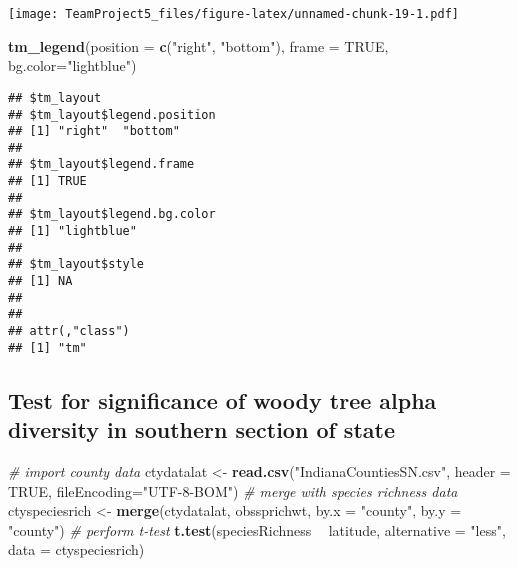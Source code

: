 \documentclass[
]{article}
\newenvironment{Shaded}{\begin{snugshade}}{\end{snugshade}}
\newcommand{\CommentTok}[1]{\textcolor[rgb]{0.56,0.35,0.01}{\textit{#1}}}
\newcommand{\DataTypeTok}[1]{\textcolor[rgb]{0.13,0.29,0.53}{#1}}
\newcommand{\KeywordTok}[1]{\textcolor[rgb]{0.13,0.29,0.53}{\textbf{#1}}}
\newcommand{\NormalTok}[1]{#1}
\newcommand{\OperatorTok}[1]{\textcolor[rgb]{0.81,0.36,0.00}{\textbf{#1}}}
\newcommand{\OtherTok}[1]{\textcolor[rgb]{0.56,0.35,0.01}{#1}}
\newcommand{\StringTok}[1]{\textcolor[rgb]{0.31,0.60,0.02}{#1}}
\begin{document}
\texttt{[image: TeamProject5\_files/figure-latex/unnamed-chunk-19-1.pdf]}

\begin{Shaded}
\begin{Highlighting}[]
\KeywordTok{tm_legend}\NormalTok{(}\DataTypeTok{position =} \KeywordTok{c}\NormalTok{(}\StringTok{"right"}\NormalTok{, }\StringTok{"bottom"}\NormalTok{), }
    \DataTypeTok{frame =} \OtherTok{TRUE}\NormalTok{,}
    \DataTypeTok{bg.color=}\StringTok{"lightblue"}\NormalTok{)}
\end{Highlighting}
\end{Shaded}

\begin{verbatim}
## $tm_layout
## $tm_layout$legend.position
## [1] "right"  "bottom"
## 
## $tm_layout$legend.frame
## [1] TRUE
## 
## $tm_layout$legend.bg.color
## [1] "lightblue"
## 
## $tm_layout$style
## [1] NA
## 
## 
## attr(,"class")
## [1] "tm"
\end{verbatim}

\hypertarget{test-for-significance-of-woody-tree-alpha-diversity-in-southern-section-of-state}{%
\subsection{Test for significance of woody tree alpha diversity in
southern section of
state}\label{test-for-significance-of-woody-tree-alpha-diversity-in-southern-section-of-state}}

\begin{Shaded}
\begin{Highlighting}[]
\CommentTok{# import county data}
\NormalTok{ctydatalat <-}\StringTok{ }\KeywordTok{read.csv}\NormalTok{(}\StringTok{"IndianaCountiesSN.csv"}\NormalTok{, }\DataTypeTok{header =} \OtherTok{TRUE}\NormalTok{, }\DataTypeTok{fileEncoding=}\StringTok{"UTF-8-BOM"}\NormalTok{)}
\CommentTok{# merge with species richness data}
\NormalTok{ctyspeciesrich <-}\StringTok{ }\KeywordTok{merge}\NormalTok{(ctydatalat,}
\NormalTok{                     obssprichwt,}
                     \DataTypeTok{by.x =} \StringTok{"county"}\NormalTok{,}
                     \DataTypeTok{by.y =} \StringTok{"county"}\NormalTok{)}
\CommentTok{# perform t-test}
\KeywordTok{t.test}\NormalTok{(speciesRichness }\OperatorTok{~}\StringTok{ }\NormalTok{latitude, }\DataTypeTok{alternative =} \StringTok{"less"}\NormalTok{, }\DataTypeTok{data =}\NormalTok{ ctyspeciesrich)}
\end{Highlighting}
\end{Shaded}
\end{document}
